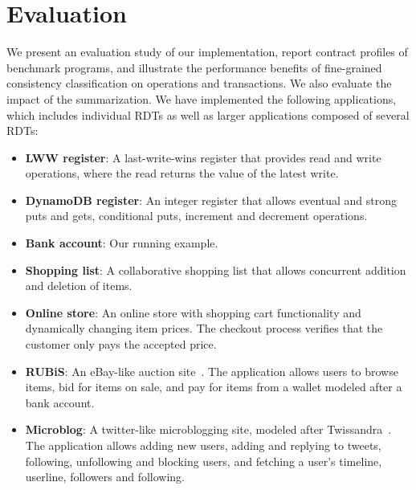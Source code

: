 \section{Evaluation}
\label{sec:results}

We present an evaluation study of our implementation, report contract
profiles of benchmark programs, and illustrate the performance benefits of
fine-grained consistency classification on operations and transactions. We
also evaluate the impact of the summarization. We have implemented the
following applications, which includes individual RDTs as well as larger
applications composed of several RDTs:

\begin{itemize}[noitemsep]
\item \textbf{LWW register}: A last-write-wins register that provides read
	and write operations, where the read returns the value of the latest write.

\item \textbf{DynamoDB register}: An integer register that allows eventual
  and strong puts and gets, conditional puts, increment and decrement
  operations.

\item \textbf{Bank account}: Our running example.

\item \textbf{Shopping list}: A collaborative shopping list that allows
  concurrent addition and deletion of items.

\item \textbf{Online store}: An online store with shopping cart
  functionality and dynamically changing item prices.  The checkout process
  verifies that the customer only pays the accepted price.

\item \textbf{RUBiS}: An eBay-like auction site~\cite{RUBiS}. The
  application allows users to browse items, bid for items on sale, and pay
  for items from a wallet modeled after a bank account.

\item \textbf{Microblog}: A twitter-like microblogging site, modeled after
  Twissandra~\cite{Twissandra}. The application allows adding new users,
  adding and replying to tweets, following, unfollowing and blocking users,
  and fetching a user's timeline, userline, followers and following.
\end{itemize}

